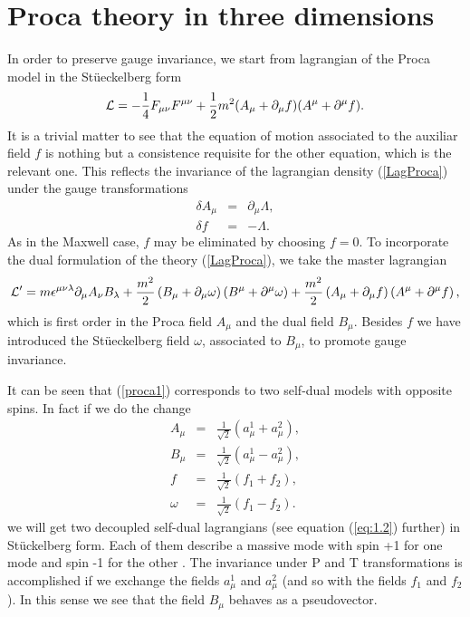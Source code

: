 \documentclass[a4paper,12pt]{article}
\newcommand{\eref}[1]{(\ref{#1})}
\begin{document}
\section{Proca theory in three dimensions}\label{sec3}

In order to preserve gauge invariance, we start from lagrangian of
the Proca model in the St\"ueckelberg form
\begin{equation}
{\cal L}=-\frac 14F_{\mu\nu}F^{\mu\nu}+\frac 12 m^2(A_\mu+\partial_\mu f)
(A^\mu+\partial^\mu f).\label{LagProca}
\end{equation}
It is a trivial matter to see that the equation of motion associated to the
auxiliar field $f$ is nothing but a consistence requisite for the other
equation, which is the relevant one. This reflects the invariance of the
lagrangian density \eref{LagProca} under the gauge transformations
\begin{eqnarray}
\delta A_\mu&=&\partial_\mu\Lambda,\\
\delta f&=&-\Lambda.
\end{eqnarray}
As in the Maxwell case, $f$ may be eliminated by choosing $f=0$. To
incorporate the dual formulation of the theory \eref{LagProca}, we take
the master lagrangian
\begin{equation}
{\cal L'}=m\epsilon^{\mu\nu\lambda}\partial_\mu A_\nu B_\lambda+
\frac{m^2}2\left(B_\mu+\partial_\mu\omega\right)\left(B^\mu+\partial^\mu\omega\right)+
\frac{m^2}2\left(A_\mu+\partial_\mu f\right)\left(A^\mu+\partial^\mu f\right),
\label{proca1}
\end{equation}
which is first order in the Proca field $A_\mu$ and the dual field $B_\mu$.
Besides $f$ we have introduced the St\"ueckelberg field $\omega$, associated
to $B_\mu$, to promote gauge invariance.

It can be seen that \eref{proca1} corresponds to two self-dual models \cite{TPN}
with opposite spins. In fact if we do the change
\begin{eqnarray}
A_\mu&=&\frac1{\sqrt{2}}\left(a_{\mu}^1+a_{\mu}^2\right),\nonumber \\
B_\mu&=&\frac1{\sqrt{2}}\left(a_{\mu}^1-a_{\mu}^2\right),\nonumber \\
f&=&\frac1{\sqrt{2}}\left(f_1+f_2\right),\nonumber \\
\omega&=&\frac1{\sqrt{2}}\left(f_1-f_2\right).
\end{eqnarray}
we will get two decoupled self-dual lagrangians (see equation
\eref{eq:1.2} further) in St\"uckelberg form. Each of them
describe a massive mode with spin +1 for one mode and spin -1 for
the other \cite{DJ}. The invariance under P and T transformations
is accomplished if we exchange the fields $a_{\mu}^1$ and
$a_{\mu}^2$ (and so with the fields $f_1$ and $f_2$). In this
sense we see that the field $B_{\mu}$ behaves as  a pseudovector.
\end{document}
